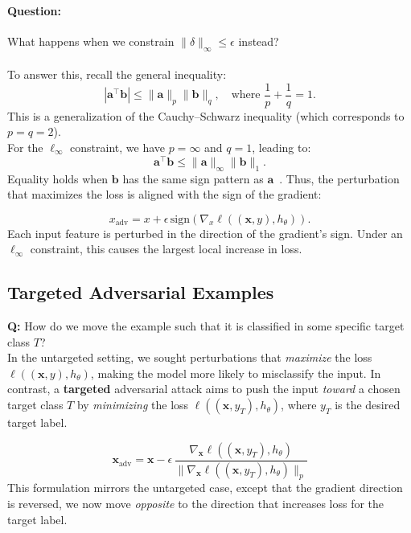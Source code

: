 \documentclass[11pt]{report}
\begin{document}
\paragraph{Question:} 
What happens when we constrain $\|\delta\|_\infty \leq \epsilon$ instead? \\ \\
\vspace{0.5em}
To answer this, recall the general inequality:
\[
|\mathbf{a}^\top \mathbf{b}| \leq \|\mathbf{a}\|_p \|\mathbf{b}\|_q, \quad \text{where } \frac{1}{p} + \frac{1}{q} = 1.
\]
This is a generalization of the Cauchy–Schwarz inequality (which corresponds to $p = q = 2$).  \\
For the $\ell_\infty$ constraint, we have $p = \infty$ and $q = 1$, leading to:
\[
\mathbf{a}^\top \mathbf{b} \leq \|\mathbf{a}\|_\infty \|\mathbf{b}\|_1.
\]
Equality holds when $\mathbf{b}$ has the same sign pattern as $\mathbf{a}$~\cite{goodfellow2015explaining}.
Thus, the perturbation that maximizes the loss is aligned with the sign of the gradient:

\[
x_{\text{adv}} = x + \epsilon \, \text{sign}\!\left(\nabla_x \ell((\mathbf{x}, y), h_\theta)\right).
\]
Each input feature is perturbed in the direction of the gradient’s sign.  
Under an $\ell_\infty$ constraint, this causes the largest local increase in loss.

\subsection*{Targeted Adversarial Examples}

\textbf{Q:} How do we move the example such that it is classified in some specific target class $T$?
\vspace{0.5em}\\
In the untargeted setting, we sought perturbations that \emph{maximize} the loss 
$\ell((\mathbf{x}, y), h_\theta)$, making the model more likely to misclassify the input.  
In contrast, a \textbf{targeted} adversarial attack aims to push the input \emph{toward} a chosen target class $T$ by 
\emph{minimizing} the loss $\ell((\mathbf{x}, y_T), h_\theta)$, where $y_T$ is the desired target label.

\[
\mathbf{x}_{\text{adv}} 
= \mathbf{x} - \epsilon \, \frac{\nabla_{\mathbf{x}} \ell((\mathbf{x}, y_T), h_\theta)}
{\|\nabla_{\mathbf{x}} \ell((\mathbf{x}, y_T), h_\theta)\|_p}
\]
This formulation mirrors the untargeted case, except that the gradient direction is reversed, we now move \emph{opposite} to the direction that increases loss for the target label.  
\end{document}
